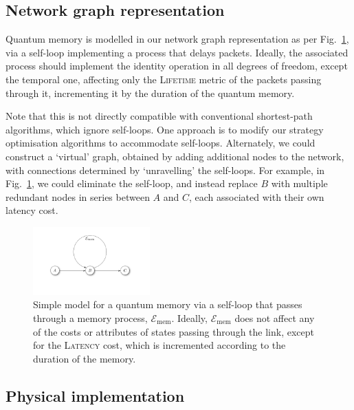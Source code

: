 %
%

\subsection{Network graph representation}

Quantum memory is modelled in our network graph representation as per Fig.~\ref{fig:memory}, via a self-loop implementing a process that delays packets. Ideally, the associated process should implement the identity operation in all degrees of freedom, except the temporal one, affecting only the \textsc{Lifetime} metric of the packets passing through it, incrementing it by the duration of the quantum memory.

Note that this is not directly compatible with conventional shortest-path algorithms, which ignore self-loops. One approach is to modify our strategy optimisation algorithms to accommodate self-loops. Alternately, we could construct a `virtual' graph, obtained by adding additional nodes to the network, with connections determined by `unravelling' the self-loops. For example, in Fig.~\ref{fig:memory}, we could eliminate the self-loop, and instead replace $B$ with multiple redundant nodes in series between $A$ and $C$, each associated with their own latency cost.

\begin{figure}[!htbp]
\includegraphics[clip=true, width=0.4\textwidth]{memory}
\captionspacefig \caption{Simple model for a quantum memory via a self-loop that passes through a memory process, $\mathcal{E}_\mathrm{mem}$. Ideally, $\mathcal{E}_\mathrm{mem}$ does not affect any of the costs or attributes of states passing through the link, except for the \textsc{Latency} cost, which is incremented according to the duration of the memory.} \label{fig:memory}
\end{figure}

%
%

\subsection{Physical implementation}

